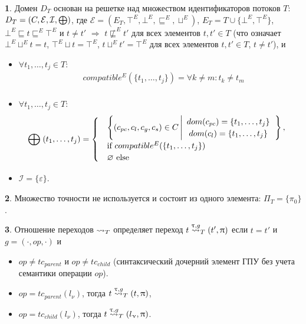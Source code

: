{\textbf 1.} Домен $D_T$ основан на решетке над множеством идентификаторов потоков $T$: 
$D_T = (C, \mathcal{E}, \mathcal{I}, \mathrel{\bigoplus})$, где $\mathcal{E}=(E_T, \top^E, \bot^E, \sqsubseteq^E, \sqcup^E)$, $E_T=T \cup \{\bot^E,\top^E\}$, $\bot^E \sqsubseteq t \sqsubseteq^E \top^E$ и $t \neq t'$ $\Rightarrow$ $t \not\sqsubseteq^E t'$ для всех элементов $t, t'\in T$ 
(что означает $\bot^E \sqcup^E t = t$, $\top^E \sqcup t = \top^E$, $t \sqcup^E t' = \top^E$ для всех элементов $t,t'\in T$, $t\neq t'$), 
и 
\begin{itemize}
\item $\forall t_1, \dots, t_j \in T:$
\begin{equation}
\begin{aligned}
& compatible^E(\{t_1,\dots, t_j\}) = \forall k\ne m: t_k\ne t_m\\
\end{aligned}
\end{equation}

\item $\forall t_1, \dots, t_j \in T:$
\begin{equation}
\begin{aligned}
& \mathrel{\bigoplus}(t_1,\dots,t_j) = 
\begin{cases}
& \left\lbrace (c_{pc},c_l,c_g,c_s) \in C 
\left| 
\begin{array}{c}
dom(c_{pc}) = \{t_1, \dots, t_j\}\\
dom(c_l) = \{t_1, \dots, t_j\}\\
\end{array}
\right.
\right\rbrace, \\
& \mbox{if } compatible^E(\{t_1,\dots, t_j\})\\
& \varnothing \mbox{ else}
\end{cases}
\end{aligned}
\end{equation}

\item $\mathcal{I}=\{\varepsilon\}$. 
\end{itemize}

{\textbf 2.} Множество точности не используется и состоит из одного элемента: $\Pi_T = \{\pi_0\}$.

{\textbf 3.} Отношение переходов $\leadsto_T$ определяет переход $t \stackrel{\uptau, g}{\leadsto}_T (t', \uppi)$ если $t=t'$ и $g=(\cdot,op,\cdot)$ и 
\begin{itemize}
\item $op \neq tc_{parent}$ и $op\neq tc_{child}$ (синтаксический дочерний элемент ГПУ без учета семантики операции $op$). 
\item $op=tc_{parent}(l_\nu)$, тогда $t \stackrel{\uptau, g}{\leadsto}_T (t, \uppi)$,
\item $op=tc_{child}(l_\nu)$, тогда $t \stackrel{\uptau, g}{\leadsto}_T (l_\upnu, \uppi)$.
\end{itemize}

